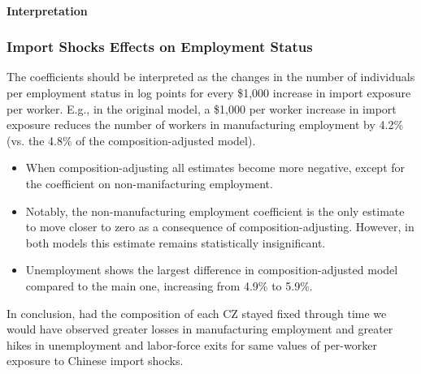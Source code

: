 \begin{frame}
    \framesubtitle{Interpretation}
    
    \frametitle{Import Shocks Effects on Employment Status}
    The coefficients should be interpreted as the changes in the number of individuals per employment status in log points for every \$1,000 increase in import exposure per worker.
    E.g., in the original model, a \$1,000 per worker increase in import exposure reduces the number of workers in manufacturing employment by 4.2\% (vs. the 4.8\% of the composition-adjusted model).

    \begin{itemize}
        \item When composition-adjusting all estimates become more negative, except for the coefficient on non-manifacturing employment.
        \item Notably, the non-manufacturing employment coefficient is the only estimate to move closer to zero as a consequence of composition-adjusting. However, in both models this estimate remains statistically insignificant.
        \item Unemployment shows the largest difference in composition-adjusted model compared to the main one, increasing from 4.9\% to 5.9\%.
    \end{itemize}

    In conclusion, had the composition of each CZ stayed fixed through time we would have observed greater losses in manufacturing employment and greater hikes in unemployment and labor-force exits for same values of per-worker exposure to Chinese import shocks.
\end{frame}

